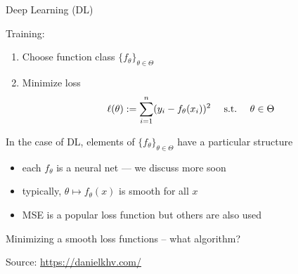 \begin{frame}{Deep Learning (DL)}

    Training:

    \begin{enumerate}
        \item Choose function class $\{f_\theta\}_{\theta \in \Theta}$ 
            \vspace{0.4em}
        \item Minimize loss 
            \begin{equation*}
                \ell(\theta) := \sum_{i=1}^n (y_i - f_\theta(x_i))^2
                \quad \ \mathrm{s.t.}\  \quad \theta \in \Theta
            \end{equation*}
    \end{enumerate}


    \pause
    \vspace{0.5em}
    In the case of DL, elements of $\{f_\theta\}_{\theta \in \Theta}$
    have a particular structure

    \begin{itemize}
        \item each $f_\theta$ is a neural net --- we discuss more soon
        \vspace{0.5em}
        \item typically, $\theta \mapsto f_\theta(x)$ is smooth for all $x$
        \vspace{0.5em}
        \item MSE is a popular loss function but others are also used
    \end{itemize}

\end{frame}


\begin{frame}
    

    Minimizing a smooth loss functions  -- what algorithm?
    
    \begin{figure}
       \begin{center}
       \end{center}
    \end{figure}

    Source: \url{https://danielkhv.com/}

\end{frame}


